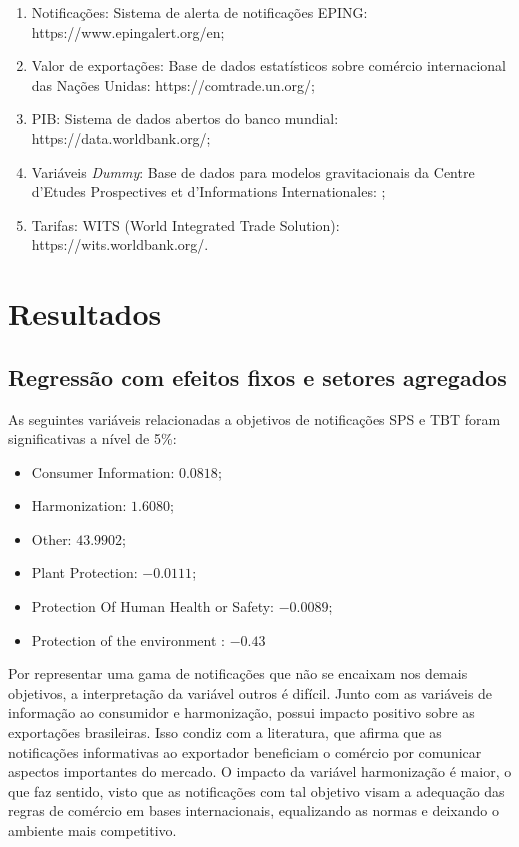 \documentclass[12pt, a4paper]{article}
\begin{document}
\begin{enumerate}
    \item Notificações: Sistema de alerta de notificações EPING: https://www.epingalert.org/en;
    \item Valor de exportações: Base de dados estatísticos sobre comércio internacional das Nações Unidas: https://comtrade.un.org/;
    \item PIB: Sistema de dados abertos do banco mundial: https://data.worldbank.org/;
    \item Variáveis \emph{Dummy}: Base de dados para modelos gravitacionais da Centre d'Etudes Prospectives et d'Informations Internationales: \cite{CEPII};
    \item Tarifas: WITS (World Integrated Trade Solution): https://wits.worldbank.org/.
\end{enumerate}

\newpage
\section{Resultados}

\subsection{Regressão com efeitos fixos e setores agregados}



As seguintes variáveis relacionadas a objetivos de notificações SPS e TBT foram significativas a nível de 5\%:
\begin{itemize}
    \item Consumer Information: $0.0818$;
    \item Harmonization: $1.6080$;
    \item Other: $43.9902$;
    \item Plant Protection: $-0.0111$;
    \item Protection Of Human Health or Safety: $-0.0089$;
    \item Protection of the environment : $-0.43$
\end{itemize}

Por representar uma gama de notificações que não se encaixam nos demais objetivos, a interpretação da variável outros é difícil. Junto com as variáveis de informação ao consumidor e harmonização, possui impacto positivo sobre as exportações brasileiras. Isso condiz com a literatura, que afirma que as notificações informativas ao exportador beneficiam o comércio por comunicar aspectos importantes do mercado. O impacto da variável harmonização é maior, o que faz sentido, visto que as notificações com tal objetivo visam a adequação das regras de comércio em bases internacionais, equalizando as normas e deixando o ambiente mais competitivo. 
\end{document}
